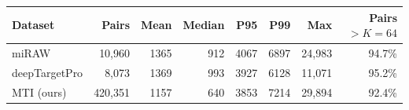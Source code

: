 \begin{tabular}{lrrrrrrr}
\toprule
Dataset & Pairs & Mean & Median & P95 & P99 & Max & Pairs $> K{=}64$ \\
\midrule
miRAW & 10,960 & 1365 & 912 & 4067 & 6897 & 24,983 & 94.7\% \\
deepTargetPro & 8,073 & 1369 & 993 & 3927 & 6128 & 11,071 & 95.2\% \\
MTI (ours) & 420,351 & 1157 & 640 & 3853 & 7214 & 29,894 & 92.4\% \\
\bottomrule
\end{tabular}
